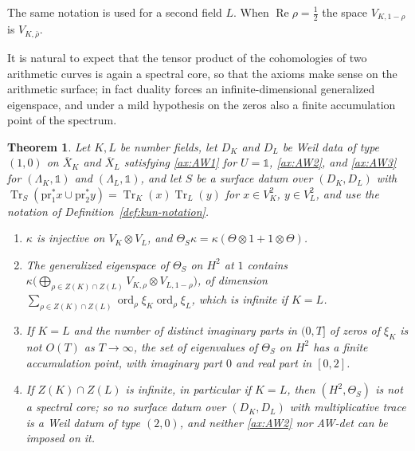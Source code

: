 \documentclass[11pt]{amsart}
\theoremstyle{plain}
\newtheorem{theorem}{Theorem}[section]
\theoremstyle{definition}
\theoremstyle{remark}
\numberwithin{equation}{section}
\newcommand{\Xbar}{\overline{X}}
\DeclareMathOperator{\Tr}{Tr}
\DeclareMathOperator{\Rea}{Re}
\DeclareMathOperator{\ord}{ord}
\renewcommand{\Re}{\Rea}
\begin{document}
The same notation is used for a second field $L$. When
$\Re\rho=\tfrac12$ the space $V_{K,1-\rho}$ is $V_{K,\bar\rho}$.

It is natural to expect that the tensor product of the cohomologies of
two arithmetic curves is again a spectral core, so that the axioms make
sense on the arithmetic surface; in fact duality forces an
infinite-dimensional generalized eigenspace, and under a mild hypothesis
on the zeros also a finite accumulation point of the spectrum.

\begin{theorem}\label{thm:kun-square}
Let $K,L$ be number fields, let $D_K$ and $D_L$ be Weil data of type
$(1,0)$ on $\Xbar_K$ and $\Xbar_L$ satisfying \ref{ax:AW1} for
$U=\mathbb 1$, \ref{ax:AW2}, and \ref{ax:AW3} for $(\Lambda_K,\mathbb 1)$
and $(\Lambda_L,\mathbb 1)$, and let $S$ be a surface datum over
$(D_K,D_L)$ with $\Tr_S(\mathrm{pr}_1^*x\cup\mathrm{pr}_2^*y)=
\Tr_K(x)\Tr_L(y)$ for $x\in V_K^2$, $y\in V_L^2$, and use the notation
of Definition~\ref{def:kun-notation}.
\begin{enumerate}[label=(\roman*)]
\item\label{item:ks-inj} $\kappa$ is injective on $V_K\otimes V_L$, and
  $\Theta_S\kappa=\kappa(\Theta\otimes1+1\otimes\Theta)$.
\item\label{item:ks-mult} The generalized eigenspace of $\Theta_S$ on
  $H^2$ at $1$ contains $\kappa\bigl(\bigoplus_{\rho\in Z(K)\cap Z(L)}
  V_{K,\rho}\otimes V_{L,1-\rho}\bigr)$, of dimension
  $\sum_{\rho\in Z(K)\cap Z(L)}\ord_\rho\xi_K\ord_\rho\xi_L$, which is
  infinite if $K=L$.
\item\label{item:ks-acc} If $K=L$ and the number of distinct imaginary
  parts in $(0,T]$ of zeros of $\xi_K$ is not $O(T)$ as $T\to\infty$,
  the set of eigenvalues of $\Theta_S$ on $H^2$ has a finite
  accumulation point, with imaginary part $0$ and real part in $[0,2]$.
\item\label{item:ks-core} If $Z(K)\cap Z(L)$ is infinite, in particular
  if $K=L$, then $(H^2,\Theta_S)$ is not a spectral core; so no surface
  datum over $(D_K,D_L)$ with multiplicative trace is a Weil datum of
  type $(2,0)$, and neither \ref{ax:AW2} nor AW-det can be imposed on
  it.
\end{enumerate}
\end{theorem}
\end{document}
